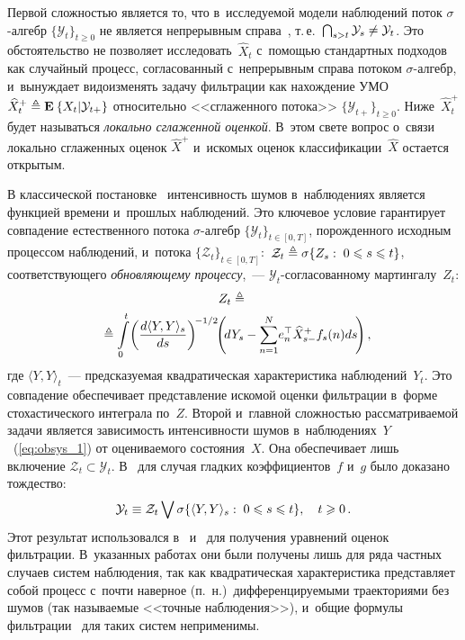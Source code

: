\begin{multicols}{2}
  Первой сложностью является то, что в~иссле\-ду\-емой модели наблюдений 
  поток $\sigma$-ал\-гебр $\{\mathcal{Y}_t\}_{t \geqslant 0}$ не 
  является непрерывным справа~\cite{S_14}, т.\,е.\ 
  $\bigcap_{s > t}\mathcal{Y}_s\hm \neq \mathcal{Y}_t$. Это обстоятельство не 
  позволяет исследовать~$\widehat{X}_t$ с~помощью стандартных подходов как 
  случайный процесс, согласованный с~непрерывным справа потоком $\sigma$-ал\-гебр, 
  и~вынуждает видоизменять задачу фильтрации как нахождение УМО 
  $\widehat{X}_t^+ \triangleq \mathbf{E}_{  }\left\{ \mathop{X_t|\mathcal{Y}_{t+}} \right\}$ относительно 
  <<сглаженного потока>> $\{\mathcal{Y}_{t+}\}_{t \geqslant 0}$. 
  Ниже~$\widehat{X}_t^+$ будет называться \textit{локально сглаженной оценкой}. 
  В~этом свете вопрос о~связи локально сглаженных оценок $\widehat{X}^+$ 
  и~искомых оценок классификации~$\widehat{X}$ остается открытым.

В классической постановке~\cite{LS_86} интенсивность шумов в~наблюдениях 
является функцией времени и~прошлых наблюдений. Это ключевое условие гарантирует 
совпадение естественного потока $\sigma$-ал\-гебр $\{\mathcal{Y}_t\}_{t\in [0,T]}$, 
порожденного исходным процессом наблюдений, 
и~потока $\{\mathcal{Z}_t\}_{t\in [0,T]}:$ 
$\mathcal{Z}_t \triangleq \sigma \{Z_s: \; 0 \hm\leqslant s \hm\leqslant t\}$, 
соответствующего \textit{обнов\-ля\-юще\-му процессу},~--- $\mathcal{Y}_t$-согласованному мартингалу~$Z_t$:
\begin{multline}
Z_t \triangleq {}\\
\hspace*{-1mm}{}\triangleq \int\limits_0^t\! \left(\fr{d\langle Y,Y\rangle_s}{ds}\right)^{\!-1/2}\!\!
\left( \!dY_s - \sum\limits_{n=1}^N\! e_n^{\top} \widehat{X}_{s-}^+ f_s(n)ds \!\right),
\!\!\label{eq:innov}\!\!
\end{multline}
где $\langle Y,Y\rangle_t$~--- предсказуемая квадратическая характеристика 
наблюдений~$Y_t$.
  Это совпадение обеспечивает представление искомой оценки фильтрации в~форме 
  стохастического интеграла по~$Z$.
 Второй и~главной сложностью рассматриваемой задачи является зависимость 
 интенсивности шумов в~наблюдениях~$Y$~(\ref{eq:obsys_1}) от оцениваемого 
 состояния~$X$. %
 Она обеспечивает лишь включение 
 $\mathcal{Z}_t \subset \mathcal{Y}_t$. В~\cite{TA_85} для случая гладких 
 коэффициентов~$f$ и~$g$ было доказано тождество:
 $$
 \mathcal{Y}_t \equiv \mathcal{Z}_t \bigvee \sigma\{\langle Y,Y\rangle_s: \; 0 
 \hm\leqslant s \leqslant t\},\quad t \geqslant 0\,.
 $$
Этот результат использовался в~\cite{CKX_09} и~\cite{JLG_95} для получения 
уравнений оценок фильтрации. В~указанных работах они были получены лишь для 
ряда частных случаев систем наблюдения, так как квадратическая характеристика 
представляет собой процесс с~почти наверное (п.~н.)\ дифференцируемыми траекториями без шумов 
(так называемые <<точные наблюдения>>), и~общие формулы фильтрации~\cite{LS_86} 
для таких систем неприменимы.


\end{multicols}
